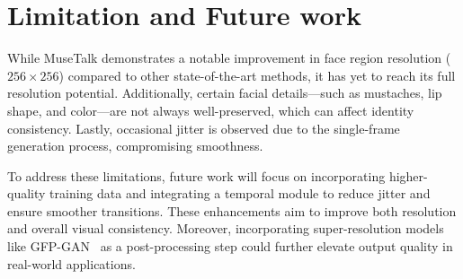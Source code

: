 \documentclass[10pt,twocolumn,letterpaper]{article}
\begin{document}
\section{Limitation and Future work}
While MuseTalk demonstrates a notable improvement in face region resolution ($256\times256$) compared to other state-of-the-art methods, it has yet to reach its full resolution potential. Additionally, certain facial details—such as mustaches, lip shape, and color—are not always well-preserved, which can affect identity consistency. Lastly, occasional jitter is observed due to the single-frame generation process, compromising smoothness.

To address these limitations, future work will focus on incorporating higher-quality training data and integrating a temporal module to reduce jitter and ensure smoother transitions. These enhancements aim to improve both resolution and overall visual consistency. Moreover, incorporating super-resolution models like GFP-GAN~\cite{wang2021towards} as a post-processing step could further elevate output quality in real-world applications.


\end{document}
